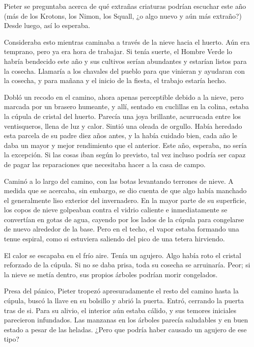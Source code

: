 Pieter se preguntaba acerca de qué extrañas criaturas podrían escuchar este año (más de los Krotons, los Nimon, los Squall, ¿o algo nuevo y aún más extraño?) Desde luego, así lo esperaba.



Consideraba esto mientras caminaba a través de la nieve hacia el huerto. Aún era temprano, pero ya era hora de trabajar. Si tenía suerte, el Hombre Verde lo habría bendecido este año y sus cultivos serían abundantes y estarían listos para la cosecha. Llamaría a los chavales del pueblo para que vinieran y ayudaran con la cosecha, y para mañana y el inicio de la fiesta, el trabajo estaría hecho.



Dobló un recodo en el camino, ahora apenas perceptible debido a la nieve, pero marcada por un brasero humeante, y allí, sentado en cuclillas en la colina, estaba la cúpula de cristal del huerto. Parecía una joya brillante, acurrucada entre los ventisqueros, llena de luz y calor. Sintió una oleada de orgullo. Había heredado esta parcela de su padre diez años antes, y la había cuidado bien, cada año le daba un mayor y mejor rendimiento que el anterior. Este año, esperaba, no sería la excepción. Si las cosas iban según lo previsto, tal vez incluso podría ser capaz de pagar las reparaciones que necesitaba hacer a la casa de campo.


Caminó a lo largo del camino, con las botas levantando terrones de nieve. A medida que se acercaba, sin embargo, se dio cuenta de que algo había manchado el generalmente liso exterior del invernadero. En la mayor parte de su superficie, los copos de nieve golpeaban contra el vidrio caliente e inmediatamente se convertían en gotas de agua, cayendo por los lados de la cúpula para congelarse de nuevo alrededor de la base. Pero en el techo, el vapor estaba formando una tenue espiral, como si estuviera saliendo del pico de una tetera hirviendo.



El calor se escapaba en el frío aire. Tenía un agujero. Algo había roto el cristal reforzado de la cúpula. Si no se daba prisa, toda su cosecha se arruinaría. Peor; si la nieve se metía dentro, sus propios árboles podrían morir congelados.



Presa del pánico, Pieter tropezó apresuradamente el resto del camino hasta la cúpula, buscó la llave en su bolsillo y abrió la puerta. Entró, cerrando la puerta tras de si. Para su alivio, el interior aún estaba cálido, y sus temores iniciales parecieron infundados. Las manzanas en los árboles parecía saludables y en buen estado a pesar de las heladas. ¿Pero que podría haber causado un agujero de ese tipo?



